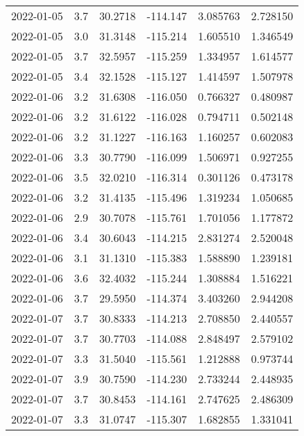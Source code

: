 \begin{tabular}{lrrrrr}
2022-01-05 &       3.7 &  30.2718 &  -114.147 &         3.085763 &         2.728150 \\
2022-01-05 &       3.0 &  31.3148 &  -115.214 &         1.605510 &         1.346549 \\
2022-01-05 &       3.7 &  32.5957 &  -115.259 &         1.334957 &         1.614577 \\
2022-01-05 &       3.4 &  32.1528 &  -115.127 &         1.414597 &         1.507978 \\
2022-01-06 &       3.2 &  31.6308 &  -116.050 &         0.766327 &         0.480987 \\
2022-01-06 &       3.2 &  31.6122 &  -116.028 &         0.794711 &         0.502148 \\
2022-01-06 &       3.2 &  31.1227 &  -116.163 &         1.160257 &         0.602083 \\
2022-01-06 &       3.3 &  30.7790 &  -116.099 &         1.506971 &         0.927255 \\
2022-01-06 &       3.5 &  32.0210 &  -116.314 &         0.301126 &         0.473178 \\
2022-01-06 &       3.2 &  31.4135 &  -115.496 &         1.319234 &         1.050685 \\
2022-01-06 &       2.9 &  30.7078 &  -115.761 &         1.701056 &         1.177872 \\
2022-01-06 &       3.4 &  30.6043 &  -114.215 &         2.831274 &         2.520048 \\
2022-01-06 &       3.1 &  31.1310 &  -115.383 &         1.588890 &         1.239181 \\
2022-01-06 &       3.6 &  32.4032 &  -115.244 &         1.308884 &         1.516221 \\
2022-01-06 &       3.7 &  29.5950 &  -114.374 &         3.403260 &         2.944208 \\
2022-01-07 &       3.7 &  30.8333 &  -114.213 &         2.708850 &         2.440557 \\
2022-01-07 &       3.7 &  30.7703 &  -114.088 &         2.848497 &         2.579102 \\
2022-01-07 &       3.3 &  31.5040 &  -115.561 &         1.212888 &         0.973744 \\
2022-01-07 &       3.9 &  30.7590 &  -114.230 &         2.733244 &         2.448935 \\
2022-01-07 &       3.7 &  30.8453 &  -114.161 &         2.747625 &         2.486309 \\
2022-01-07 &       3.3 &  31.0747 &  -115.307 &         1.682855 &         1.331041 \\

\end{tabular}
